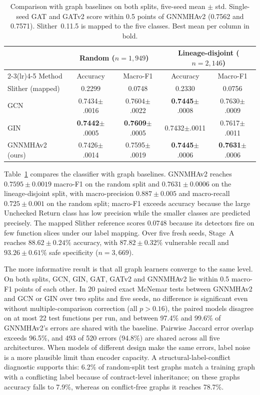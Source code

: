 \documentclass[runningheads]{llncs}
\begin{document}
\begin{table}[t]
\centering
\footnotesize
\caption{Comparison with graph baselines on both splits, five-seed mean $\pm$ std. Single-seed GAT and GATv2 score within 0.5 points of GNNMHAv2 (0.7562 and 0.7571). Slither~0.11.5 is mapped to the five classes. Best mean per column in bold.}
\label{tab:baselines}
\setlength{\tabcolsep}{3pt}
\begin{tabular}{lcccc}
\toprule
& \multicolumn{2}{c}{Random ($n=1{,}949$)} & \multicolumn{2}{c}{Lineage-disjoint ($n=2{,}146$)} \\
\cmidrule(lr){2-3}\cmidrule(lr){4-5}
Method & Accuracy & Macro-F1 & Accuracy & Macro-F1 \\
\midrule
Slither (mapped)  & 0.2299 & 0.0748 & 0.2330 & 0.0756 \\
GCN               & 0.7434$\pm$.0016 & 0.7604$\pm$.0022 & \textbf{0.7445}$\pm$.0008 & 0.7630$\pm$.0009 \\
GIN               & \textbf{0.7442}$\pm$.0005 & \textbf{0.7609}$\pm$.0005 & 0.7432$\pm$.0011 & 0.7617$\pm$.0011 \\
GNNMHAv2 (ours)   & 0.7426$\pm$.0014 & 0.7595$\pm$.0019 & \textbf{0.7445}$\pm$.0006 & \textbf{0.7631}$\pm$.0006 \\
\bottomrule
\end{tabular}
\end{table}

Table~\ref{tab:baselines} compares the classifier with graph baselines. GNNMHAv2 reaches $0.7595\pm0.0019$ macro-F1 on the random split and $0.7631\pm0.0006$ on the lineage-disjoint split, with macro-precision $0.887\pm0.005$ and macro-recall $0.725\pm0.001$ on the random split; macro-F1 exceeds accuracy because the large Unchecked Return class has low precision while the smaller classes are predicted precisely. The mapped Slither reference scores $0.0748$ because its detectors fire on few function slices under our label mapping. Over five fresh seeds, Stage~A reaches $88.62\pm0.24\%$ accuracy, with $87.82\pm0.32\%$ vulnerable recall and $93.26\pm0.61\%$ safe specificity ($n=3{,}669$).

The more informative result is that all graph learners converge to the same level. On both splits, GCN, GIN, GAT, GATv2 and GNNMHAv2 lie within 0.5 macro-F1 points of each other. In 20 paired exact McNemar tests between GNNMHAv2 and GCN or GIN over two splits and five seeds, no difference is significant even without multiple-comparison correction (all $p>0.16$), the paired models disagree on at most 22 test functions per run, and between 97.4\% and 99.6\% of GNNMHAv2's errors are shared with the baseline. Pairwise Jaccard error overlap exceeds 96.5\%, and 493 of 520 errors (94.8\%) are shared across all five architectures. When models of different design make the same errors, label noise is a more plausible limit than encoder capacity. A structural-label-conflict diagnostic supports this: 6.2\% of random-split test graphs match a training graph with a conflicting label because of contract-level inheritance; on these graphs accuracy falls to 7.9\%, whereas on conflict-free graphs it reaches 78.7\%.
\end{document}
